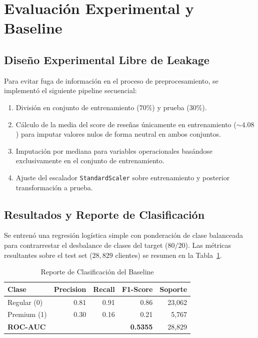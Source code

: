 \documentclass[journal,letterpaper]{IEEEtran}
\begin{document}
\section{Evaluación Experimental y Baseline}
\subsection{Diseño Experimental Libre de Leakage}
Para evitar fuga de información en el proceso de preprocesamiento, se implementó el siguiente pipeline secuencial:
\begin{enumerate}
    \item División en conjunto de entrenamiento ($70\%$) y prueba ($30\%$).
    \item Cálculo de la media del score de reseñas únicamente en entrenamiento ($\sim 4.08$) para imputar valores nulos de forma neutral en ambos conjuntos.
    \item Imputación por mediana para variables operacionales basándose exclusivamente en el conjunto de entrenamiento.
    \item Ajuste del escalador \texttt{StandardScaler} sobre entrenamiento y posterior transformación a prueba.
\end{enumerate}

\subsection{Resultados y Reporte de Clasificación}
Se entrenó una regresión logística simple con ponderación de clase balanceada para contrarrestar el desbalance de clases del target ($80/20$). Las métricas resultantes sobre el test set ($28,829$ clientes) se resumen en la Tabla~\ref{tab:metrics}.

\begin{table}[h]
\centering
\caption{Reporte de Clasificación del Baseline}
\label{tab:metrics}
\begin{tabular}{lrrrr}
\toprule
Clase & Precision & Recall & F1-Score & Soporte \\
\midrule
Regular (0) & 0.81 & 0.91 & 0.86 & 23,062 \\
Premium (1) & 0.30 & 0.16 & 0.21 & 5,767 \\
\midrule
\textbf{ROC-AUC} & & & \textbf{0.5355} & 28,829 \\
\bottomrule
\end{tabular}
\end{table}
\end{document}
